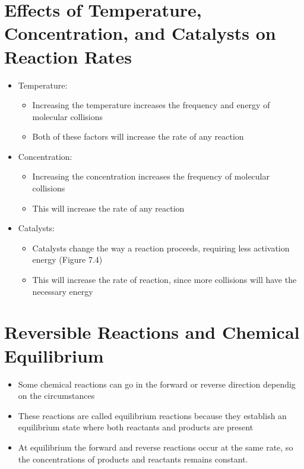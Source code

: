 \documentclass[12pt, openany, letterpaper]{memoir}
\begin{document}
\section{Effects of Temperature, Concentration, and Catalysts on Reaction Rates}
\begin{itemize}
	\item Temperature:
	      \begin{itemize}
		      \item Increasing the temperature increases the frequency and energy of molecular collisions
		      \item Both of these factors will increase the rate of any reaction
	      \end{itemize}
	\item Concentration:
	      \begin{itemize}
		      \item Increasing the concentration increases the frequency of molecular collisions
		      \item This will increase the rate of any reaction
	      \end{itemize}
	\item Catalysts:
	      \begin{itemize}
		      \item Catalysts change the way a reaction proceeds, requiring less activation energy (Figure 7.4)
		      \item This will increase the rate of reaction, since more collisions will have the necessary energy
	      \end{itemize}
\end{itemize}
\section{Reversible Reactions and Chemical Equilibrium}
\begin{itemize}
	\item Some chemical reactions can go in the forward or reverse direction dependig on the circumstances
	\item These reactions are called equilibrium reactions because they establish an equilibrium state where both reactants and products are present
	\item At equilibrium the forward and reverse reactions occur at the same rate, so the concentrations of products and reactants remains constant.
\end{itemize}
\end{document}
